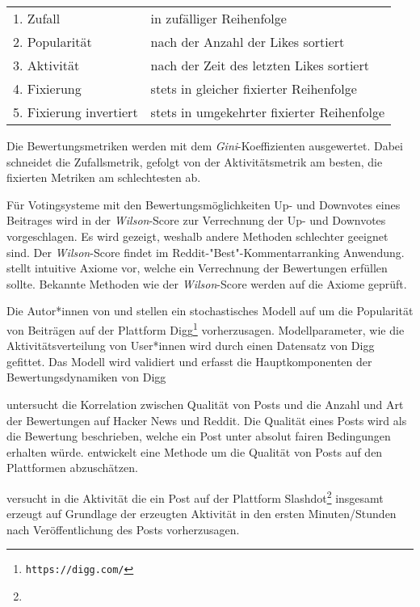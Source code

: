 \begin{table}[!htbp]
	\begin{tabularx}{\textwidth}{lX}
		1. Zufall &in zufälliger Reihenfolge\\
		2. Popularität&nach der Anzahl der Likes sortiert \\
		3. Aktivität &nach der Zeit des letzten Likes sortiert\\ 
		4. Fixierung&stets in gleicher fixierter Reihenfolge\\
		5. Fixierung invertiert &stets in umgekehrter fixierter Reihenfolge
	\end{tabularx}
\end{table}

Die Bewertungsmetriken werden mit dem \textit{Gini}-Koeffizienten ausgewertet. Dabei schneidet die Zufallsmetrik, gefolgt von der Aktivitätsmetrik am besten, die fixierten Metriken am schlechtesten ab.

Für Votingsysteme mit den Bewertungsmöglichkeiten Up- und Downvotes eines Beitrages wird in \cite{miller} der \textit{Wilson}-Score zur Verrechnung der Up- und Downvotes vorgeschlagen. Es wird gezeigt, weshalb andere Methoden schlechter geeignet sind. Der \textit{Wilson}-Score findet im Reddit-"Best"-Kommentarranking Anwendung. \citeauthor{Zhang2011238} stellt intuitive Axiome vor, welche ein Verrechnung der Bewertungen erfüllen sollte. Bekannte Methoden wie der \textit{Wilson}-Score werden auf die Axiome geprüft.

Die Autor*innen von \cite{Hogg20121} und \cite{Lerman2010621} stellen ein stochastisches Modell auf um die Popularität von Beiträgen auf der Plattform Digg\footnote{\texttt{https://digg.com/}} vorherzusagen. Modellparameter, wie die Aktivitätsverteilung von User*innen wird durch einen Datensatz von Digg gefittet. Das Modell wird validiert und erfasst die Hauptkomponenten der Bewertungsdynamiken von Digg

\cite{Stoddard2015416} untersucht die Korrelation zwischen Qualität von Posts und die Anzahl und Art der Bewertungen auf Hacker News und Reddit. Die Qualität eines Posts wird als die Bewertung beschrieben, welche ein Post unter absolut fairen Bedingungen erhalten würde. \citeauthor{Stoddard2015416} entwickelt eine Methode um die Qualität von Posts auf den Plattformen abzuschätzen.

\citeauthor{Kaltenbrunner200757} versucht in \cite{Kaltenbrunner200757} die Aktivität die ein Post auf der Plattform Slashdot\footnote{\texttt{}} insgesamt erzeugt auf Grundlage der erzeugten Aktivität in den ersten Minuten/Stunden nach Veröffentlichung des Posts vorherzusagen. 

